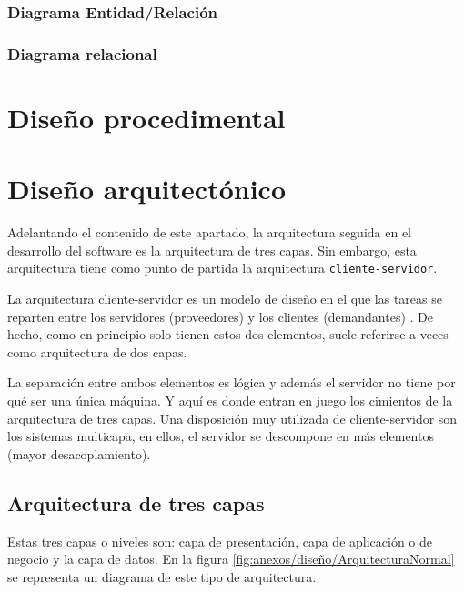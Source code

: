 \begin{landscape}
\subsubsection{Diagrama Entidad/Relación}
\end{landscape}

\subsubsection{Diagrama relacional}
\section{Diseño procedimental}


\section{Diseño arquitectónico}

Adelantando el contenido de este apartado, la arquitectura seguida en el
desarrollo del software es la arquitectura de tres capas. Sin embargo, esta
arquitectura tiene como punto de partida la arquitectura
\texttt{cliente-servidor}.

La arquitectura cliente-servidor es un modelo de diseño en el que las tareas se
reparten entre los servidores (proveedores) y los clientes (demandantes)
\cite{eswiki:149310099}. De hecho, como en principio solo tienen estos dos
elementos, suele referirse a veces como arquitectura de dos capas.

La separación entre ambos elementos es lógica y además el servidor no tiene por
qué ser una única máquina. Y aquí es donde entran en juego los cimientos de la
arquitectura de tres capas. Una disposición muy utilizada de cliente-servidor
son los sistemas multicapa, en ellos, el servidor se descompone en más elementos
(mayor desacoplamiento).

\subsection{Arquitectura de tres capas}

Estas tres capas o niveles son: capa de presentación, capa de aplicación o de
negocio y la capa de datos. En la figura
\ref{fig:anexos/diseño/ArquitecturaNormal} se representa un diagrama de este
tipo de arquitectura.

